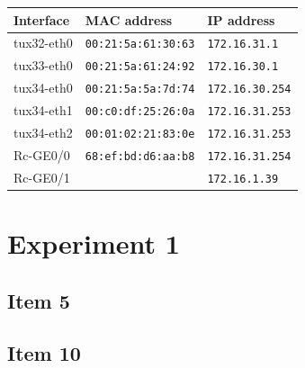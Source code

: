 \documentclass[a4paper, 11pt]{report}
\begin{document}
\begin{center}
    \begin{tabular}{l | l | l}
        \textbf{Interface} & \textbf{MAC address}       & \textbf{IP address}    \\ \hline
        tux32-eth0         & \texttt{00:21:5a:61:30:63} & \texttt{172.16.31.1  } \\
        tux33-eth0         & \texttt{00:21:5a:61:24:92} & \texttt{172.16.30.1  } \\
        tux34-eth0         & \texttt{00:21:5a:5a:7d:74} & \texttt{172.16.30.254} \\
        tux34-eth1         & \texttt{00:c0:df:25:26:0a} & \texttt{172.16.31.253} \\
        tux34-eth2         & \texttt{00:01:02:21:83:0e} & \texttt{172.16.31.253} \\
        Rc-GE0/0           & \texttt{68:ef:bd:d6:aa:b8} & \texttt{172.16.31.254} \\
        Rc-GE0/1           & \texttt{                 } & \texttt{172.16.1.39  } \\
    \end{tabular}
\end{center}

\section{Experiment 1}
\setcounter{subsection}{4}
\subsection{Item 5}





\begin{landscape}
\setcounter{subsection}{9}
\subsection{Item 10}

\end{landscape}
\end{document}
